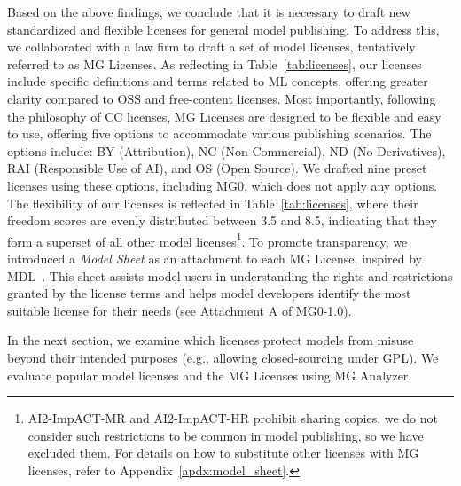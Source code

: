 Based on the above findings, we conclude that it is necessary to draft new standardized and flexible licenses for general model publishing.
To address this, we collaborated with a law firm to draft a set of model licenses, tentatively referred to as MG Licenses. 
As reflecting in Table~\ref{tab:licenses}, our licenses include specific definitions and terms related to ML concepts, offering greater clarity compared to OSS and free-content licenses. 
Most importantly, following the philosophy of CC licenses, MG Licenses are designed to be flexible and easy to use, offering five options to accommodate various publishing scenarios.
The options include: BY (Attribution), NC (Non-Commercial), ND (No Derivatives), RAI (Responsible Use of AI), and OS (Open Source).
We drafted nine preset licenses using these options, including MG0, which does not apply any options.
The flexibility of our licenses is reflected in Table~\ref{tab:licenses}, where their freedom scores are evenly distributed between 3.5 and 8.5, indicating that they form a superset of all other model licenses\footnote{AI2-ImpACT-MR and AI2-ImpACT-HR prohibit sharing copies, we do not consider such restrictions to be common in model publishing, so we have excluded them. For details on how to substitute other licenses with MG licenses, refer to Appendix~\ref{apdx:model_sheet}.}.
To promote transparency, we introduced a \emph{Model Sheet} as an attachment to each MG License, inspired by MDL~\cite{benjamin2019towards}. 
This sheet assists model users in understanding the rights and restrictions granted by the license terms and helps model developers identify the most suitable license for their needs (see Attachment A of \href{https://github.com/morningD/ModelGo-Analyzer/blob/main/MGLicense/MG0.txt}{MG0-1.0}).

In the next section, we examine which licenses protect models from misuse beyond their intended purposes (e.g., allowing closed-sourcing under GPL). We evaluate popular model licenses and the MG Licenses using MG Analyzer.



